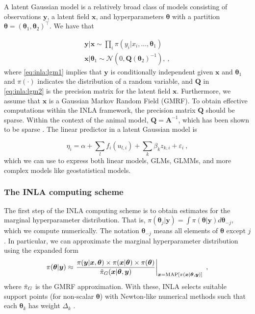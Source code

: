 A latent Gaussian model is a relatively broad class of models consisting of observations $\bm y$, a latent field $\bm x$, and hyperparameters $\bm \theta$ with a partition $\bm\theta = (\bm \theta_1, \bm \theta_2)^\top$. We have that

\begin{align}
    \bm y | \bm x \sim \prod_i \pi(y_i | x_i, \dots, \bm \theta_1) \label{eq:inla:lgm1} \\
    \bm x | \bm \theta_1 \sim \mathcal N(0, \bm Q(\bm\theta_2)^{-1}), \label{eq:inla:lgm2} \ ,
\end{align}
where \eqref{eq:inla:lgm1} implies that $\bm y$ is conditionally independent given $\bm x$ and $\bm \theta_1$ and $\pi(\cdot)$ indicates the distribution of a random variable, and $\bm Q$ in \eqref{eq:inla:lgm2} is the precision matrix for the latent field $\bm x$. Furthermore, we assume that $\bm x$ is a Gaussian Markov Random Field (GMRF). To obtain effective computations within the INLA framework, the precision matrix $\bm Q$ should be sparse. Within the context of the animal model, $\bm Q = \bm A^{-1}$, which has been shown to be sparse \autocite{steinsland2010utilizing}. The linear predictor in a latent Gaussian model is

\begin{equation}
    \eta_i = \alpha + \sum_{l} f_i(u_{l,i}) + \sum_k \beta_k z_{k,i} + \varepsilon_i \ ,
\end{equation}
which we can use to express both linear models, GLMs, GLMMs, and more complex models like geostatistical models. 

\subsubsection*{The INLA computing scheme} 

The first step of the INLA computing scheme is to obtain estimates for the marginal hyperparameter distribution. That is, $\pi(\bm\theta_j | \bm y) = \int \pi(\bm \theta | \bm y) d\bm\theta_{-j}$, which we compute numerically. The notation $\bm\theta_{-j}$ means all elements of $\bm\theta$ except $j$. In particular, we can approximate the marginal hyperparameter distribution using the expanded form \autocite{gentleINLA}
\begin{equation}
    \pi(\bm\theta|\bm y) \approx \left.\frac{\pi(\bm y | \bm x, \bm \theta) \times \pi(\bm x | \bm \theta) \times \pi(\bm \theta)}{\Tilde{\pi}_G(\bm x | \bm \theta, \bm y)}\right|_{\bm x = \operatorname{MAP}[\pi(\bm x |\bm \theta, \bm y)]} \ ,
\end{equation}
where $\Tilde{\pi}_G$ is the GMRF approximation.
With these, INLA selects suitable support points (for non-scalar $\bm\theta$) with Newton-like numerical methods such that each $\bm\theta_k$ has weight $\Delta_k$ \autocite{gentleINLA}.

